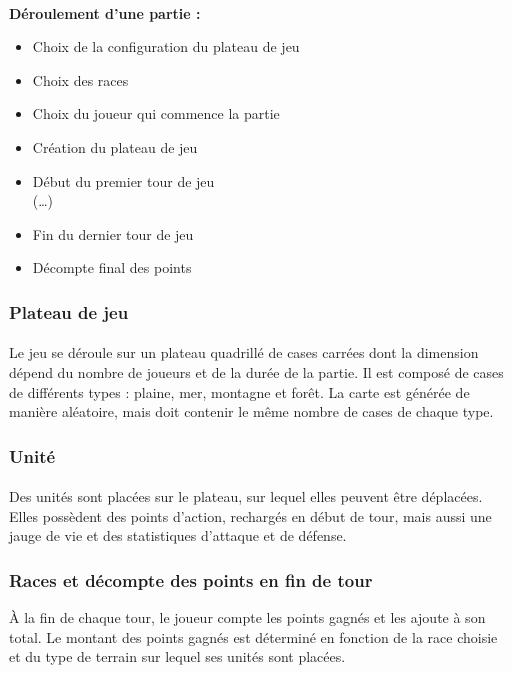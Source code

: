 \documentclass[a4paper]{article}
\begin{document}
\paragraph{}
\textbf{Déroulement d'une partie : }
\begin{itemize}
    \item Choix de la configuration du plateau de jeu
    \item Choix des races
    \item Choix du joueur qui commence la partie
    \item Création du plateau de jeu
    \item Début du premier tour de jeu\\(\dots)
    \item Fin du dernier tour de jeu
    \item Décompte final des points
\end{itemize}

\subsubsection{Plateau de jeu}
\paragraph{}
Le jeu se déroule sur un plateau quadrillé de cases carrées dont la dimension dépend du nombre de joueurs et de la durée de la partie.\label{map_gen} Il est composé de cases de différents types : plaine, mer, montagne et forêt. La carte est générée de manière aléatoire, mais doit contenir le même nombre de cases de chaque type.

\subsubsection{Unité}
\paragraph{}
Des unités sont placées sur le plateau, sur lequel elles peuvent être déplacées. Elles possèdent des points d'action, rechargés en début de tour, mais aussi une jauge de vie et des statistiques d'attaque et de défense.

\subsubsection{Races et décompte des points en fin de tour}
À la fin de chaque tour, le joueur compte les points gagnés et les ajoute à son total. Le montant des points gagnés est déterminé en fonction de la race choisie et du type de terrain sur lequel ses unités sont placées.
\end{document}
